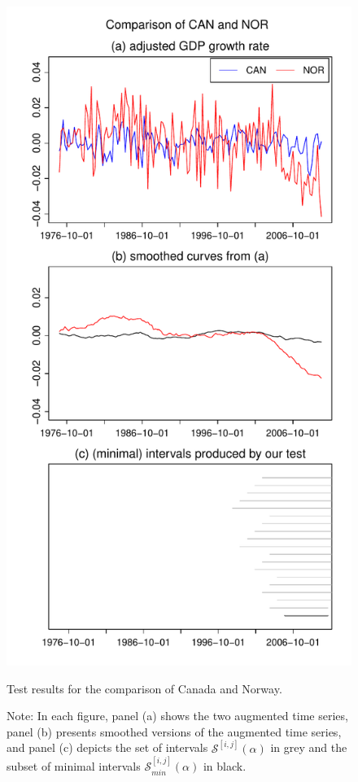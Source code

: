 \documentclass[a4paper,12pt]{article}
\begin{document}
\begin{figure}[p!]
\begin{minipage}[t]{0.49\textwidth}
\includegraphics[width=\textwidth]{Plots/CAN_vs_NOR}
\caption{Test results for the comparison of Canada and Norway.}\label{fig:Canada:Norway}
\end{minipage}
\caption*{Note: In each figure, panel (a) shows the two augmented time series, panel (b) presents smoothed versions of the augmented time series, and panel (c) depicts the set of intervals $\mathcal{S}^{[i,j]}(\alpha)$ in grey and the subset of minimal intervals $\mathcal{S}^{[i,j]}_{min}(\alpha)$ in black.}
\end{figure}
\end{document}
